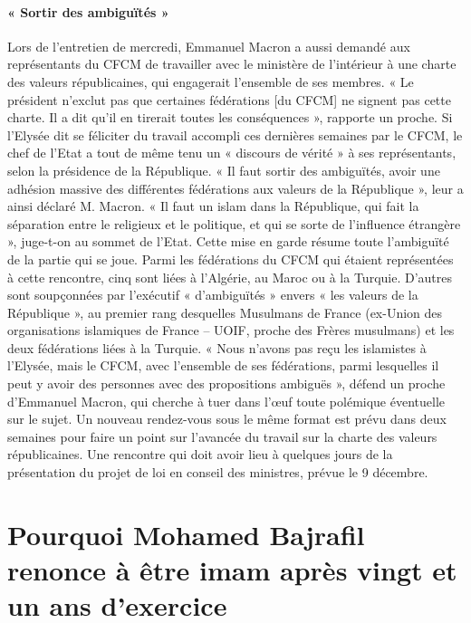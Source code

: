 \paragraph{« Sortir des ambiguïtés »}
Lors de l’entretien de mercredi, Emmanuel Macron a aussi demandé aux représentants du CFCM de travailler avec le ministère de l’intérieur à une charte des valeurs républicaines, qui engagerait l’ensemble de ses membres. « Le président n’exclut pas que certaines fédérations [du CFCM] ne signent pas cette charte. Il a dit qu’il en tirerait toutes les conséquences », rapporte un proche. Si l’Elysée dit se féliciter du travail accompli ces dernières semaines par le CFCM, le chef de l’Etat a tout de même tenu un « discours de vérité » à ses représentants, selon la présidence de la République. « Il faut sortir des ambiguïtés, avoir une adhésion massive des différentes fédérations aux valeurs de la République », leur a ainsi déclaré M. Macron. « Il faut un islam dans la République, qui fait la séparation entre le religieux et le politique, et qui se sorte de l’influence étrangère », juge-t-on au sommet de l’Etat.
Cette mise en garde résume toute l’ambiguïté de la partie qui se joue. Parmi les fédérations du CFCM qui étaient représentées à cette rencontre, cinq sont liées à l’Algérie, au Maroc ou à la Turquie. D’autres sont soupçonnées par l’exécutif « d’ambiguïtés » envers « les valeurs de la République », au premier rang desquelles Musulmans de France (ex-Union des organisations islamiques de France – UOIF, proche des Frères musulmans) et les deux fédérations liées à la Turquie. « Nous n’avons pas reçu les islamistes à l’Elysée, mais le CFCM, avec l’ensemble de ses fédérations, parmi lesquelles il peut y avoir des personnes avec des propositions ambiguës », défend un proche d’Emmanuel Macron, qui cherche à tuer dans l’œuf toute polémique éventuelle sur le sujet. Un nouveau rendez-vous sous le même format est prévu dans deux semaines pour faire un point sur l’avancée du travail sur la charte des valeurs républicaines. Une rencontre qui doit avoir lieu à quelques jours de la présentation du projet de loi en conseil des ministres, prévue le 9 décembre.

\section*{Pourquoi Mohamed Bajrafil renonce à être imam après vingt et un ans d’exercice}
\label{Theo:Bajrafil1}

